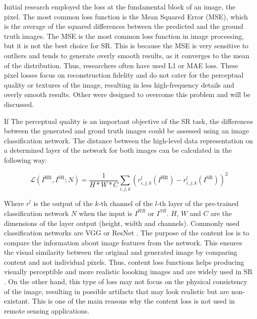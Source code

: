         Initial research employed the loss at the fundamental block of an image, the pixel.
        The most common loss function is the Mean Squared Error (MSE), which is the average of the squared differences between the predicted and the ground truth images.
        The MSE is the most common loss function in image processing, but it is not the best choice for SR.
        This is because the MSE is very sensitive to outliers and tends to generate overly smooth results, as it converges to the mean of the distribution. Thus, researchers often have used L1 or MAE loss.
        These pixel losses focus on reconstruction fidelity and do not cater for the perceptual quality or textures of the image, resulting in less high-frequency details and overly smooth results. Other were designed to overcome this problem and will be discussed.

        If The perceptual quality is an important objective of the SR task, the differences between the generated and groud truth images could be assessed using an image classification network. The distance between the high-level data representation on a determined layer of the network for both images can be calculated in the following way:

        \begin{equation}
            \mathcal{L}(I^{\text{HR}}, I^{\text{SR}}; N) = \frac{1}{H*W*C}\sum_{i,j,k}(r^{l}_{i,j,k}(I^{\text{HR}}) - r^{l}_{i,j,k}(I^{\text{SR}}))^2
        \end{equation}

        Where $r^{l}$ is the output of the $k$-th channel of the $l$-th layer of the pre-trained classification network $N$ when the input is $I^{HR}$ or $I^{SR}$. $H$, $W$ and $C$ are the dimensions of the layer output (height, width and channels). 
        Commonly used classification networks are VGG \cite{simonyan2015deep} or ResNet \cite{he2015deep}.
        The purpose of the content los is to compare the information about image features from the network. This ensures the visual similarity between the original and generated image by comparing content and not individual pixels. Thus, content loss functions helps producing visually perceptible and more realistic loooking images and are widely used in SR \cite{ledig2017photorealistic,wang2018recovering}. On the other hand, this type of loss may not focus on the physical consistency of the image, resulting in possible artifacts that may look realistic but are non-existant. This is one of the main reasons why the content loss is not used in remote sensing applications.

